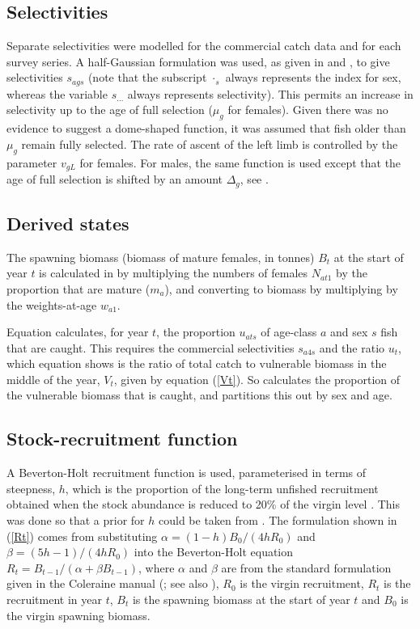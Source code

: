 \subsection{Selectivities}

Separate selectivities were modelled for the commercial catch data and for each survey series. A half-Gaussian formulation was used, as given in  and , to give selectivities $s_{ags}$ (note that the subscript $\cdot_s$ always represents the index for sex, whereas the variable $s_{...}$ always represents selectivity). This permits an increase in selectivity up to the age of full selection ($\mu_g$ for females). Given there was no evidence to suggest a dome-shaped function, it was assumed that fish older than $\mu_g$ remain fully selected. The rate of ascent of the left limb is controlled by the parameter $v_{gL}$ for females. For males, the same function is used except that the age of full selection is shifted by an amount $\Delta_g$, see . 


\subsection{Derived states}

The spawning biomass (biomass of mature females, in tonnes) $B_t$ at the start of year $t$ is calculated in  by multiplying the numbers of females $N_{at1}$ by the proportion that are mature ($m_a$), and converting to biomass by multiplying by the weights-at-age $w_{a1}$.

Equation  calculates, for year $t$, the proportion $u_{ats}$ of age-class $a$ and sex $s$ fish that are caught. This requires the commercial selectivities $s_{a4s}$ and the ratio $u_t$, which equation  shows is the ratio of total catch to vulnerable biomass in the middle of the year, $V_t$, given by equation (\ref{Vt}). So  calculates the proportion of the vulnerable biomass that is caught, and  partitions this out by sex and age.

\subsection{Stock-recruitment function}

A Beverton-Holt recruitment function is used, parameterised in terms of steepness, $h$, which is the proportion of the long-term unfished recruitment obtained when the stock abundance is reduced to 20\% of the virgin level \citep{md88, mm04}. This was done so that a prior for $h$ could be taken from \citet{fmdms10}. The formulation shown in (\ref{Rt}) comes from substituting $\alpha = (1 - h) B_0 / (4 h R_0)$ and $\beta = (5 h - 1) / (4 h R_0)$ into the Beverton-Holt equation $R_t = B_{t-1} / (\alpha + \beta B_{t-1})$, where $\alpha$ and $\beta$ are from the standard formulation given in the Coleraine manual (\citealt{hmpeps03}; see also \citealt{mm04}), $R_0$ is the virgin recruitment, $R_t$ is the recruitment in year $t$, $B_t$ is the spawning biomass at the start of year $t$ and $B_0$ is the virgin spawning biomass. 

